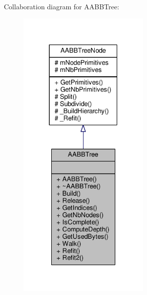 Collaboration diagram for A\+A\+B\+B\+Tree\+:
\nopagebreak
\begin{figure}[H]
\begin{center}
\leavevmode
\includegraphics[width=184pt]{d8/d22/classAABBTree__coll__graph}
\end{center}
\end{figure}
